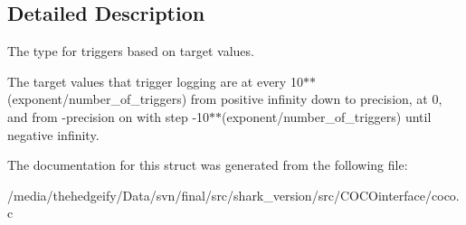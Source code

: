 \subsection{Detailed Description}
The type for triggers based on target values. 

The target values that trigger logging are at every 10$\ast$$\ast$(exponent/number\+\_\+of\+\_\+triggers) from positive infinity down to precision, at 0, and from -\/precision on with step -\/10$\ast$$\ast$(exponent/number\+\_\+of\+\_\+triggers) until negative infinity. 

The documentation for this struct was generated from the following file\+:\begin{DoxyCompactItemize}
\item 
/media/thehedgeify/\+Data/svn/final/src/shark\+\_\+version/src/\+C\+O\+C\+Ointerface/coco.\+c\end{DoxyCompactItemize}
